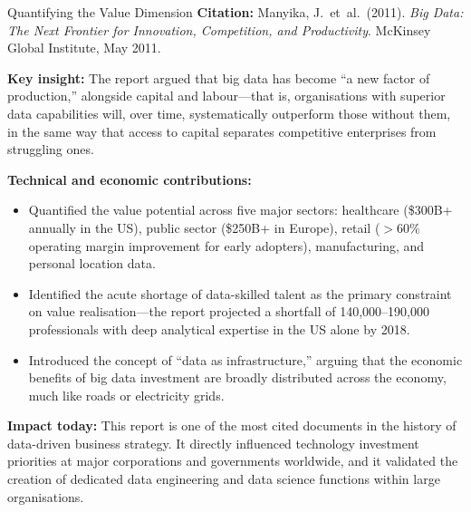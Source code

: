 \begin{researchspotlight}{Quantifying the Value Dimension}
\textbf{Citation:} Manyika, J.\ et~al.\ (2011). \textit{Big Data: The
Next Frontier for Innovation, Competition, and Productivity}. McKinsey
Global Institute, May 2011. \parencite{McKinsey2011}

\smallskip\noindent
\textbf{Key insight:} The report argued that big data has become ``a new
factor of production,'' alongside capital and labour---that is,
organisations with superior data capabilities will, over time,
systematically outperform those without them, in the same way that
access to capital separates competitive enterprises from struggling ones.

\smallskip\noindent
\textbf{Technical and economic contributions:}
\begin{itemize}
  \item Quantified the value potential across five major sectors:
        healthcare (\$300B+ annually in the US), public sector
        (\$250B+ in Europe), retail ($>$60\% operating margin
        improvement for early adopters), manufacturing, and personal
        location data.
  \item Identified the acute shortage of data-skilled talent as the
        primary constraint on value realisation---the report projected
        a shortfall of 140,000--190,000 professionals with deep
        analytical expertise in the US alone by 2018.
  \item Introduced the concept of ``data as infrastructure,'' arguing
        that the economic benefits of big data investment are broadly
        distributed across the economy, much like roads or electricity
        grids.
\end{itemize}

\smallskip\noindent
\textbf{Impact today:} This report is one of the most cited documents
in the history of data-driven business strategy. It directly influenced
technology investment priorities at major corporations and governments
worldwide, and it validated the creation of dedicated data engineering
and data science functions within large organisations.
\end{researchspotlight}

